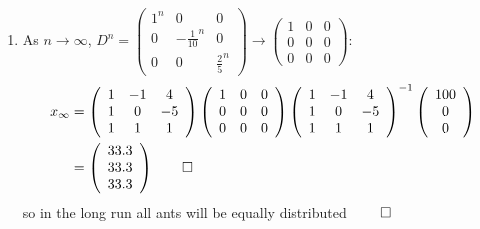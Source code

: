 \documentclass[12pt, a4paper]{article}
\begin{document}
\begin{enumerate}[Q\arabic*.]
\begin{enumerate}[(\alph*)]
      \item As $n\rightarrow\infty$, $D^n = \left(\begin{array}{ccc} 1^n & 0 & 0\\ 0 & -\frac{1}{10}^n & 0\\ 0 & 0 & \frac{2}{5}^n \end{array}\right) \rightarrow \left(\begin{array}{ccc} 1 & 0 & 0\\ 0 & 0 & 0\\ 0 & 0 & 0 \end{array}\right)$:
        \begin{align*}
          x_{\infty} &= \left(\begin{array}{ccc} 1 & -1 & 4\\ 1 & 0 & -5\\ 1 & 1 & 1 \end{array}\right)\left(\begin{array}{ccc} 1 & 0 & 0\\ 0 & 0 & 0\\ 0 & 0 & 0 \end{array}\right) \left(\begin{array}{ccc} 1 & -1 & 4\\ 1 & 0 & -5\\ 1 & 1 & 1 \end{array}\right)^{-1}\left(\begin{array}{c} 100\\ 0\\ 0 \end{array}\right)\\
              &= \left(\begin{array}{c} 33.3\\ 33.3\\ 33.3 \end{array}\right) \qed
        \end{align*}
        so in the long run all ants will be equally distributed $\qed$


\end{enumerate}
\end{enumerate}
\end{document}
